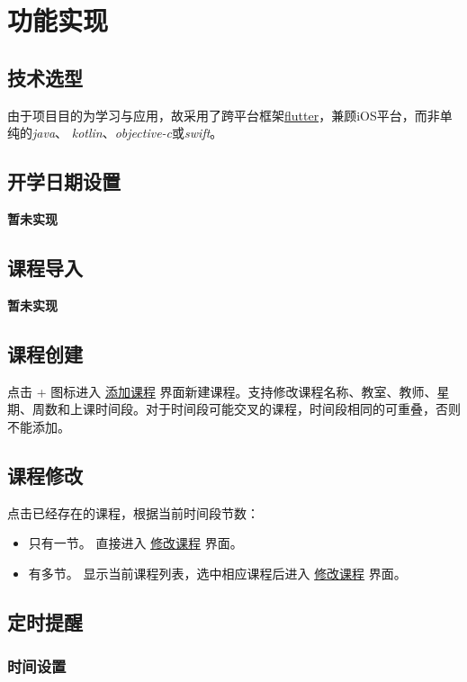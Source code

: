 \documentclass[12pt]{article}
\begin{document}
\section{功能实现}

  \subsection{技术选型}

    由于项目目的为学习与应用，故采用了跨平台框架\href{https://flutter.dev/}{flutter}，兼顾iOS平台，而非单纯的\textit{java}、
    \textit{kotlin}、\textit{objective-c}或\textit{swift}。

  \subsection{开学日期设置}

    \bf 暂未实现

  \subsection{课程导入}

    \bf 暂未实现

  \subsection{课程创建}

    点击 + 图标进入 \uline{添加课程} 界面新建课程。支持修改课程名称、教室、教师、星
    期、周数和上课时间段。对于时间段可能交叉的课程，时间段相同的可重叠，否则不能添加。

  \subsection{课程修改}

    点击已经存在的课程，根据当前时间段节数：
    \begin{itemize}
      \item 只有一节。 直接进入 \uline{修改课程} 界面。
      \item 有多节。 显示当前课程列表，选中相应课程后进入 \uline{修改课程} 界面。
    \end{itemize}

  \subsection{定时提醒}

    \subsubsection{时间设置}
\end{document}
